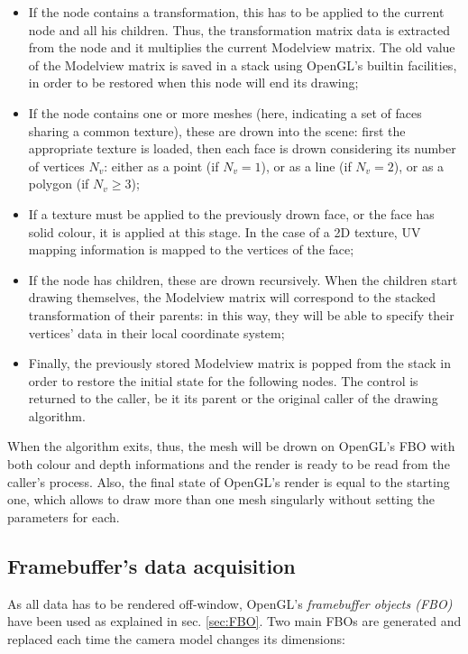 \begin{itemize}
  \item{If the node contains a transformation, this has to be applied to the
      current node and all his children. Thus, the transformation matrix data is
      extracted from the node and it multiplies the current Modelview matrix.
      The old value of the Modelview matrix is saved in a stack using OpenGL's
      builtin facilities, in order to be restored when this node will end its
    drawing;}
  \item{If the node contains one or more meshes (here, indicating a set of
      faces sharing a common texture), these are drown into the scene: first the
      appropriate texture is loaded, then each face is drown considering its
      number of vertices $N_v$: either as a point (if $N_v=1$), or as a line (if
    $N_v=2$), or as a polygon (if $N_v \geq 3$);}
  \item{If a texture must be applied to the previously drown face, or the face
      has solid colour, it is applied at this stage. In the case of a 2D
    texture, UV mapping information is mapped to the vertices of the face;}
  \item{If the node has children, these are drown recursively. When the children
      start drawing themselves, the Modelview matrix will correspond to the
      stacked transformation of their parents: in this way, they will be able to
    specify their vertices' data in their local coordinate system;}
  \item{Finally, the previously stored Modelview matrix is popped from the stack
      in order to restore the initial state for the following nodes. The
      control is returned to the caller, be it its parent or the
    original caller of the drawing algorithm.}
\end{itemize}

When the algorithm exits, thus, the mesh will be drown on OpenGL's FBO
with both colour and depth informations and the render is ready to be read from the
caller's process. Also, the final state of OpenGL's render is equal to the
starting one, which allows to draw more than one mesh singularly without
setting the parameters for each.

\subsection{Framebuffer's data acquisition}
As all data has to be rendered off-window, OpenGL's \emph{framebuffer objects
(\emph{FBO})} have been used as explained in sec. \ref{sec:FBO}. Two main FBOs
are generated and replaced each time the camera model changes its dimensions:

